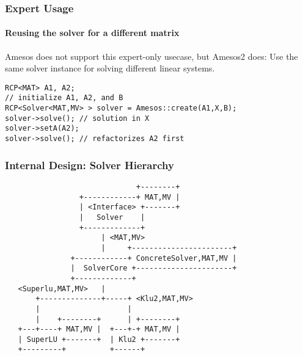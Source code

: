 \documentclass[xcolor=dvipsnames]{beamer}
\begin{document}
\begin{frame}[fragile]
  \frametitle{Expert Usage}
  \framesubtitle{Reusing the solver for a different matrix}
  
  Amesos does not support this expert-only usecase, but Amesos2 does:
  Use the same solver instance for solving different linear systems.

  \begin{lstlisting}
RCP<MAT> A1, A2;
// initialize A1, A2, and B
RCP<Solver<MAT,MV> > solver = Amesos::create(A1,X,B);
solver->solve(); // solution in X
solver->setA(A2);
solver->solve(); // refactorizes A2 first
  \end{lstlisting}
\end{frame}


\begin{frame}
  \frametitle{Internal Design: Solver Hierarchy}
\begin{center}
\begin{verbatim}
                              +--------+
                 +------------+ MAT,MV |
                 | <Interface> +-------+
                 |   Solver    |
                 +-------------+
                      | <MAT,MV>
                      |     +-----------------------+
               +------------+ ConcreteSolver,MAT,MV |
               |  SolverCore +----------------------+
               +-------------+ 
   <Superlu,MAT,MV>   |      
       +--------------+-----+ <Klu2,MAT,MV>
       |                    |
       |    +--------+      | +--------+
   +---+----+ MAT,MV |  +---+-+ MAT,MV |
   | SuperLU +-------+  | Klu2 +-------+
   +---------+          +------+
\end{verbatim}
\end{center}
\end{frame}
\end{document}
